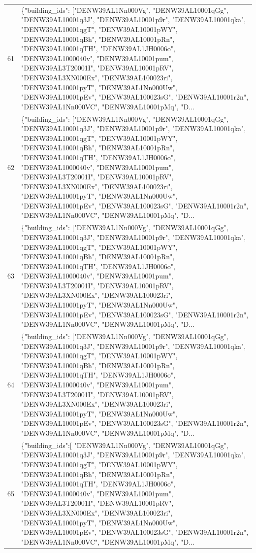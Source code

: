 \documentclass[a4paper,11pt]{article}
\begin{document}
\begin{table}[ht]
\begin{tabular}{r p{12cm}}
61 & \{"building\_ids": ["DENW39AL1Nn000Vg", "DENW39AL10001qGg", "DENW39AL10001q3J", "DENW39AL10001p9r", "DENW39AL10001qka", "DENW39AL10001qgT", "DENW39AL10001pWY", "DENW39AL10001qBh", "DENW39AL10001pRn", "DENW39AL10001qTH", "DENW39AL1JH0006o", "DENW39AL1000040v", "DENW39AL10001pum", "DENW39AL3T20001I", "DENW39AL10001pRV", "DENW39AL3XN000Ex", "DENW39AL100023ri", "DENW39AL10001pyT", "DENW39AL1Nn000Uw", "DENW39AL10001pEv", "DENW39AL100023sG", "DENW39AL10001r2n", "DENW39AL1Nn000VC", "DENW39AL10001pMq", "D... \\
62 & \{"building\_ids": ["DENW39AL1Nn000Vg", "DENW39AL10001qGg", "DENW39AL10001q3J", "DENW39AL10001p9r", "DENW39AL10001qka", "DENW39AL10001qgT", "DENW39AL10001pWY", "DENW39AL10001qBh", "DENW39AL10001pRn", "DENW39AL10001qTH", "DENW39AL1JH0006o", "DENW39AL1000040v", "DENW39AL10001pum", "DENW39AL3T20001I", "DENW39AL10001pRV", "DENW39AL3XN000Ex", "DENW39AL100023ri", "DENW39AL10001pyT", "DENW39AL1Nn000Uw", "DENW39AL10001pEv", "DENW39AL100023sG", "DENW39AL10001r2n", "DENW39AL1Nn000VC", "DENW39AL10001pMq", "D... \\
63 & \{"building\_ids": ["DENW39AL1Nn000Vg", "DENW39AL10001qGg", "DENW39AL10001q3J", "DENW39AL10001p9r", "DENW39AL10001qka", "DENW39AL10001qgT", "DENW39AL10001pWY", "DENW39AL10001qBh", "DENW39AL10001pRn", "DENW39AL10001qTH", "DENW39AL1JH0006o", "DENW39AL1000040v", "DENW39AL10001pum", "DENW39AL3T20001I", "DENW39AL10001pRV", "DENW39AL3XN000Ex", "DENW39AL100023ri", "DENW39AL10001pyT", "DENW39AL1Nn000Uw", "DENW39AL10001pEv", "DENW39AL100023sG", "DENW39AL10001r2n", "DENW39AL1Nn000VC", "DENW39AL10001pMq", "D... \\
64 & \{"building\_ids": ["DENW39AL1Nn000Vg", "DENW39AL10001qGg", "DENW39AL10001q3J", "DENW39AL10001p9r", "DENW39AL10001qka", "DENW39AL10001qgT", "DENW39AL10001pWY", "DENW39AL10001qBh", "DENW39AL10001pRn", "DENW39AL10001qTH", "DENW39AL1JH0006o", "DENW39AL1000040v", "DENW39AL10001pum", "DENW39AL3T20001I", "DENW39AL10001pRV", "DENW39AL3XN000Ex", "DENW39AL100023ri", "DENW39AL10001pyT", "DENW39AL1Nn000Uw", "DENW39AL10001pEv", "DENW39AL100023sG", "DENW39AL10001r2n", "DENW39AL1Nn000VC", "DENW39AL10001pMq", "D... \\
65 & \{"building\_ids":[ "DENW39AL1Nn000Vg", "DENW39AL10001qGg", "DENW39AL10001q3J", "DENW39AL10001p9r", "DENW39AL10001qka", "DENW39AL10001qgT", "DENW39AL10001pWY", "DENW39AL10001qBh", "DENW39AL10001pRn", "DENW39AL10001qTH", "DENW39AL1JH0006o", "DENW39AL1000040v", "DENW39AL10001pum", "DENW39AL3T20001I", "DENW39AL10001pRV", "DENW39AL3XN000Ex", "DENW39AL100023ri", "DENW39AL10001pyT", "DENW39AL1Nn000Uw", "DENW39AL10001pEv", "DENW39AL100023sG", "DENW39AL10001r2n", "DENW39AL1Nn000VC", "DENW39AL10001pMq", "D... \\

\end{tabular}
\end{table}
\end{document}
